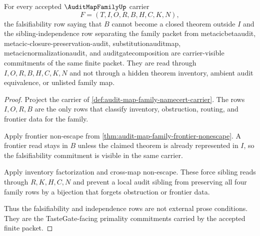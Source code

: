 \begin{theorem}
\label{thm:audit-map-family-tastegate-primality-commitment}
For every accepted $\AuditMapFamilyUp$ carrier
$$
F=(T,I,O,R,B,H,C,K,N),
$$
the falsifiability row saying that $B$ cannot become a closed theorem outside $I$ and the sibling-independence row separating the family packet from metacicbetaaudit, metacic-closure-preservation-audit, substitutionauditmap, metacicnormalizationaudit, and auditgatecomposition are carrier-visible commitments of the same finite packet. They are read through $I,O,R,B,H,C,K,N$ and not through a hidden theorem inventory, ambient audit equivalence, or unlisted family map.
\end{theorem}
\begin{proof}
Project the carrier of \autoref{def:audit-map-family-namecert-carrier}. The rows $I,O,R,B$ are the only rows that classify inventory, obstruction, routing, and frontier data for the family.

Apply frontier non-escape from \autoref{thm:audit-map-family-frontier-nonescape}. A frontier read stays in $B$ unless the claimed theorem is already represented in $I$, so the falsifiability commitment is visible in the same carrier.

Apply inventory factorization and cross-map non-escape. These force sibling reads through $R,K,H,C,N$ and prevent a local audit sibling from preserving all four family rows by a bijection that forgets obstruction or frontier data.

Thus the falsifiability and independence rows are not external prose conditions. They are the TasteGate-facing primality commitments carried by the accepted finite packet.
\end{proof}

